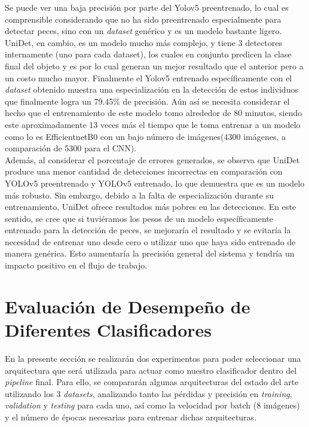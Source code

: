 Se puede ver una baja precisión por parte del Yolov5 preentrenado, lo cual es comprensible considerando que no ha sido preentrenado especialmente para detectar peces, sino con un \textit{dataset} genérico y es un modelo bastante ligero. UniDet, en cambio, es un modelo mucho más complejo, y tiene 3 detectores internamente (uno para cada dataset), los cuales en conjunto predicen la clase final del objeto y es por lo cual generan un mejor resultado que el anterior pero a un costo mucho mayor. Finalmente el Yolov5 entrenado específicamente con el \textit{dataset} obtenido muestra una especialización en la detección de estos individuos que finalmente logra un 79.45\% de precisión. Aún así se necesita considerar el hecho que el entrenamiento de este modelo tomo alrededor de 80 minutos, siendo este aproximadamente 13 veces más el tiempo que le toma entrenar a un modelo como lo es EfficientnetB0 con un bajo número de imágenes(4300 imágenes, a comparación de 5300 para el CNN).
\\

Además, al considerar el porcentaje de errores generados, se observa que UniDet produce 
una menor cantidad de detecciones incorrectas en comparación con YOLOv5 preentrenado y 
YOLOv5 entrenado, lo que demuestra que es un modelo más robusto. Sin embargo, debido a 
la falta de especialización durante su entrenamiento, UniDet ofrece resultados más pobres 
en las detecciones. En este sentido, se cree que si tuviéramos los pesos de un modelo 
específicamente entrenado para la detección de peces, se mejoraría el resultado y se 
evitaría la necesidad de entrenar uno desde cero o utilizar uno que haya sido entrenado 
de manera genérica. Esto aumentaría la precisión general del sistema y tendría un 
impacto positivo en el flujo de trabajo.
\\

\section{Evaluación de Desempeño de Diferentes Clasificadores}
En la presente sección se realizarán dos experimentos para poder seleccionar una arquitectura que será utilizada para actuar como nuestro clasificador dentro del \textit{pipeline} final. Para ello, se compararán algunas arquitecturas del estado del arte utilizando los 3 \textit{datasets}, analizando tanto las pérdidas y precisión en \textit{training}, \textit{validation} y \textit{testing} para cada uno, así como la velocidad por batch (8 imágenes) y el número de épocas necesarias para entrenar dichas arquitecturas. 
